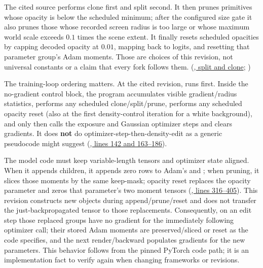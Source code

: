 The cited source performs clone first and split second. It then prunes primitives whose opacity is below the scheduled minimum; after the configured size gate it also prunes those whose recorded screen radius is too large or whose maximum world scale exceeds \(0.1\) times the scene extent. It finally resets scheduled opacities by capping decoded opacity at \(0.01\), mapping back to logits, and resetting that parameter group's Adam moments. Those are choices of this revision, not universal constants or a claim that every fork follows them. (\href{https://github.com/graphdeco-inria/gaussian-splatting/blob/54c035f7834b564019656c3e3fcc3646292f727d/scene/gaussian_model.py\#L409-L472}{, split and clone}; \href{https://github.com/graphdeco-inria/gaussian-splatting/blob/54c035f7834b564019656c3e3fcc3646292f727d/scene/gaussian_model.py\#L258-L261}{})

The training-loop ordering matters. At the cited revision,  runs first. Inside the no-gradient control block, the program accumulates visible gradient/radius statistics, performs any scheduled clone/split/prune, performs any scheduled opacity reset (also at the first density-control iteration for a white background), and only then calls the exposure and Gaussian optimizer steps and clears gradients. It does \textbf{not} do optimizer-step-then-density-edit as a generic pseudocode might suggest (\href{https://github.com/graphdeco-inria/gaussian-splatting/blob/54c035f7834b564019656c3e3fcc3646292f727d/train.py\#L142-L186}{, lines 142 and 163--186}).

The model code must keep variable-length tensors and optimizer state aligned. When it appends children, it appends zero rows to Adam's  and ; when pruning, it slices those moments by the same keep-mask; opacity reset replaces the opacity parameter and zeros that parameter's two moment tensors (\href{https://github.com/graphdeco-inria/gaussian-splatting/blob/54c035f7834b564019656c3e3fcc3646292f727d/scene/gaussian_model.py\#L316-L405}{, lines 316--405}). This revision constructs new  objects during append/prune/reset and does not transfer the just-backpropagated  tensor to those replacements. Consequently, on an edit step those replaced groups have no gradient for the immediately following optimizer call; their stored Adam moments are preserved/sliced or reset as the code specifies, and the next render/backward populates gradients for the new parameters. This behavior follows from the pinned PyTorch code path; it is an implementation fact to verify again when changing frameworks or revisions.

